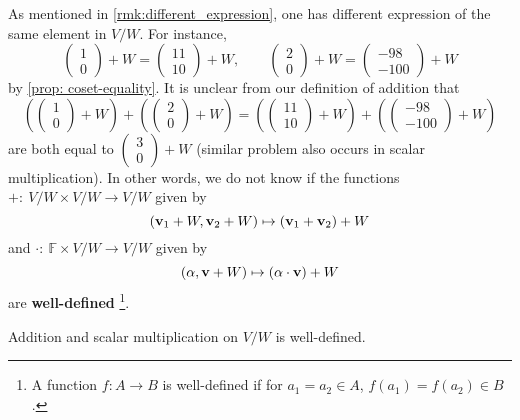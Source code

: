  As mentioned in \autoref{rmk:different_expression}, one has different expression of the same element in $V/W$. For instance,
$$\left( \begin{array}{c} 1 \\ 0 \end{array} \right) + W =  \left( \begin{array}{c} 11 \\ 10 \end{array} \right) + W , \quad \quad \left( \begin{array}{c} 2 \\ 0 \end{array} \right) + W =  \left( \begin{array}{c} -98 \\ -100 \end{array} \right) + W $$
by \autoref{prop: coset-equality}. It is unclear from our definition of addition that
$$\left( \left( \begin{array}{c} 1 \\ 0 \end{array} \right) + W \right)
+ \left( \left( \begin{array}{c} 2  \\ 0 \end{array} \right) + W \right) = \left( \left( \begin{array}{c} 11 \\ 10 \end{array} \right) + W \right)
+ \left( \left( \begin{array}{c} -98  \\ -100 \end{array} \right) + W \right)$$
are both equal to $\left( \begin{array}{c} 3  \\ 0 \end{array} \right) + W$ (similar problem also occurs in scalar multiplication). In other words, we do not know if the functions $+:\ V/W \times V/W \to V/W$ given by
$$({\bf v}_1+W, {\bf v}_2+W) \mapsto ({\bf v}_1+{\bf v}_2) +W$$
and $\cdot :\ \mathbb{F} \times V/W \to V/W$ given by
$$(\alpha, {\bf v}+W) \mapsto (\alpha\cdot {\bf v}) +W$$
are {\bf well-defined} \footnote{A function $f:A \to B$ is well-defined if for $a_1 = a_2 \in A$, $f(a_1) = f(a_2) \in B$.}.
\begin{proposition} \label{prop:coset_well_defined}
Addition and scalar multiplication on \( V/W \) is well-defined.
\end{proposition}


